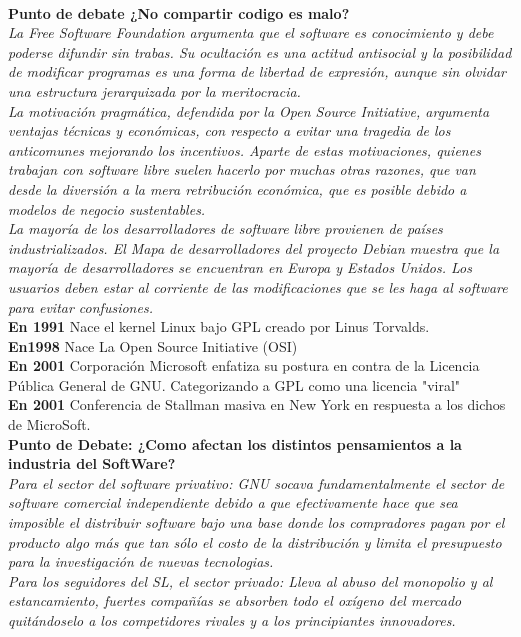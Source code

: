 \\
{\bf Punto de debate ¿No compartir codigo es malo? }
{\it 
\\
La Free Software Foundation argumenta que el software es conocimiento y debe poderse difundir sin trabas. Su ocultación es una actitud antisocial y la posibilidad de modificar programas es una forma de libertad de expresión, aunque sin olvidar una estructura jerarquizada por la meritocracia.
\\
La motivación pragmática, defendida por la Open Source Initiative, argumenta ventajas técnicas y económicas, con respecto a evitar una tragedia de los anticomunes mejorando los incentivos.
Aparte de estas motivaciones, quienes trabajan con software libre suelen hacerlo por muchas otras razones, que van desde la diversión a la mera retribución económica, que es posible debido a modelos de negocio sustentables.
\\
La mayoría de los desarrolladores de software libre provienen de países industrializados. El Mapa de desarrolladores del proyecto Debian muestra que la mayoría de desarrolladores se encuentran en Europa y Estados Unidos.
Los usuarios deben estar al corriente de las modificaciones que se les haga al software para evitar confusiones.
}
\\
{\bf En 1991} Nace el kernel Linux bajo  GPL creado por Linus Torvalds.
\\
{\bf En1998} Nace La Open Source Initiative (OSI)
\\
{\bf En 2001} Corporación Microsoft enfatiza su postura en contra de la Licencia Pública General de GNU.
Categorizando a GPL como una licencia "viral"
\\
{\bf En 2001} Conferencia de Stallman masiva en New York en respuesta a los dichos de MicroSoft.
\\
{\bf Punto de Debate: ¿Como afectan los distintos pensamientos a la industria del SoftWare? }
{\it 
\\
\emph{Para el sector del software privativo:}
GNU socava fundamentalmente el sector de software comercial independiente debido a que efectivamente hace que sea imposible el distribuir software bajo una base donde los compradores pagan por el producto algo más que tan sólo el costo de la distribución y limita el presupuesto para la investigación de nuevas tecnologias.
\\
\emph{Para los seguidores del SL, el sector privado:}
Lleva al abuso del monopolio y al estancamiento, fuertes compañías se absorben todo el oxígeno del mercado quitándoselo a los competidores rivales y a los principiantes innovadores.
}
